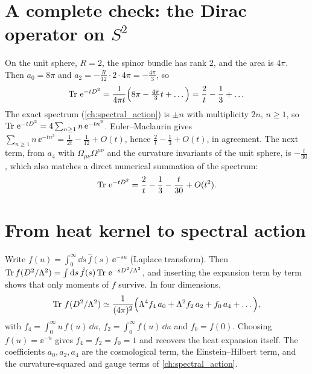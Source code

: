 \section{A complete check: the Dirac operator on $S^2$}
On the unit sphere, $R=2$, the spinor bundle has rank $2$, and the area is $4\pi$. Then $a_0=8\pi$ and $a_2=-\tfrac R{12}\cdot2\cdot4\pi=-\tfrac{4\pi}3$, so
\begin{equation}
\operatorname{Tr}\,\mathrm{e}^{-tD^2}=\frac1{4\pi t}\Big(8\pi-\tfrac{4\pi}{3}t+\dots\Big)=\frac2t-\frac13+\dots
\end{equation}
The exact spectrum (\cref{ch:spectral_action}) is $\pm n$ with multiplicity $2n$, $n\ge1$, so $\operatorname{Tr}\,\mathrm{e}^{-tD^2}=4\sum_{n\ge1}n\,\mathrm{e}^{-tn^2}$. Euler--Maclaurin gives $\sum_{n\ge1}n\,\ee^{-tn^2}=\tfrac1{2t}-\tfrac1{12}+O(t)$, hence $\tfrac2t-\tfrac13+O(t)$, in agreement. The next term, from $a_4$ with $\Omega_{\mu\nu}\Omega^{\mu\nu}$ and the curvature invariants of the unit sphere, is $-\tfrac{t}{30}$, which also matches a direct numerical summation of the spectrum:
\begin{equation}
\operatorname{Tr}\,\mathrm{e}^{-tD^2}=\frac2t-\frac13-\frac t{30}+O(t^2).
\end{equation}

\section{From heat kernel to spectral action}
Write $f(u)=\int_0^\infty\dd s\,\hat f(s)\,\ee^{-su}$ (Laplace transform). Then $\operatorname{Tr} f(D^2/\Lambda^2)=\int\mathrm{d} s\,\hat f(s)\operatorname{Tr}\,\mathrm{e}^{-sD^2/\Lambda^2}$, and inserting the expansion term by term shows that only moments of $f$ survive. In four dimensions,
\begin{equation}
\operatorname{Tr}\,f(D^2/\Lambda^2)\simeq\frac1{(4\pi)^2}\Big(\Lambda^4f_4\,a_0+\Lambda^2f_2\,a_2+f_0\,a_4+\dots\Big),
\end{equation}
with $f_4=\int_0^\infty u\,f(u)\,\dd u$, $f_2=\int_0^\infty f(u)\,\dd u$ and $f_0=f(0)$. Choosing $f(u)=\ee^{-u}$ gives $f_4=f_2=f_0=1$ and recovers the heat expansion itself. The coefficients $a_0,a_2,a_4$ are the cosmological term, the Einstein--Hilbert term, and the curvature-squared and gauge terms of \cref{ch:spectral_action}.


